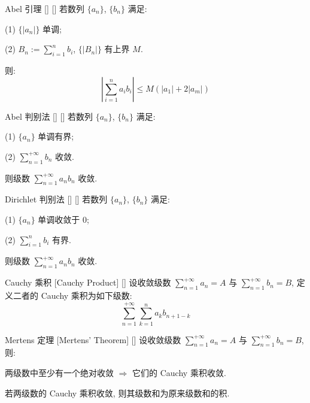 \documentclass[UTF8]{ctexart}
\begin{document}
			\begin{lma}
			    []
			    {Abel 引理}
			    []
			    []
				若数列 \(\{a_n\}\), \(\{b_n\}\) 满足: 

				(1) \(\{|a_n|\}\) 单调; 

				(2) \(B_n:=\sum\limits_{i=1}^{n}b_i\), \(\{|B_n|\}\) 有上界 \(M\). 

				则: 
				\[\left|\sum_{i=1}^{n}a_i b_i\right|\leq M(|a_1|+2|a_m|)\]
			\end{lma}

			\begin{thm}
			    []
			    {Abel 判别法}
			    []
			    []
				若数列 \(\{a_n\}\), \(\{b_n\}\) 满足: 

				(1) \(\{a_n\}\) 单调有界; 
				
				(2) \(\sum\limits_{n=1}^{+\infty}b_n\) 收敛. 

				则级数 \(\sum\limits_{n=1}^{+\infty}a_n b_n\) 收敛. 
			\end{thm}

			\begin{thm}
			    []
			    {Dirichlet 判别法}
			    []
			    []
				若数列 \(\{a_n\}\), \(\{b_n\}\) 满足: 

				(1) \(\{a_n\}\) 单调收敛于 \(0\); 
				
				(2) \(\sum\limits_{i=1}^{n}b_i\) 有界. 

				则级数 \(\sum\limits_{n=1}^{+\infty}a_n b_n\) 收敛. 
			\end{thm}
			
			\begin{dfn}
			    []
			    {Cauchy 乘积 }
			    [Cauchy Product]
			    []
				设收敛级数 \(\sum\limits_{n=1}^{+\infty}a_n=A\) 与 \(\sum\limits_{n=1}^{+\infty}b_n=B\), 定义二者的 Cauchy 乘积为如下级数: 
				\[\sum_{n=1}^{+\infty}\sum_{k=1}^{n}a_k b_{n+1-k}\]
			\end{dfn}
			
			\begin{thm}
			    []
			    {Mertens 定理 }
			    [Mertens' Theorem]
			    []
				设收敛级数 \(\sum\limits_{n=1}^{+\infty}a_n=A\) 与 \(\sum\limits_{n=1}^{+\infty}b_n=B\), 则: 
				
				两级数中至少有一个绝对收敛 \(\Longrightarrow\) 它们的 Cauchy 乘积收敛. 
			\end{thm}
			
			\begin{thm}
                {}
				若两级数的 Cauchy 乘积收敛, 则其级数和为原来级数和的积. 
			\end{thm}
		
\end{document}
